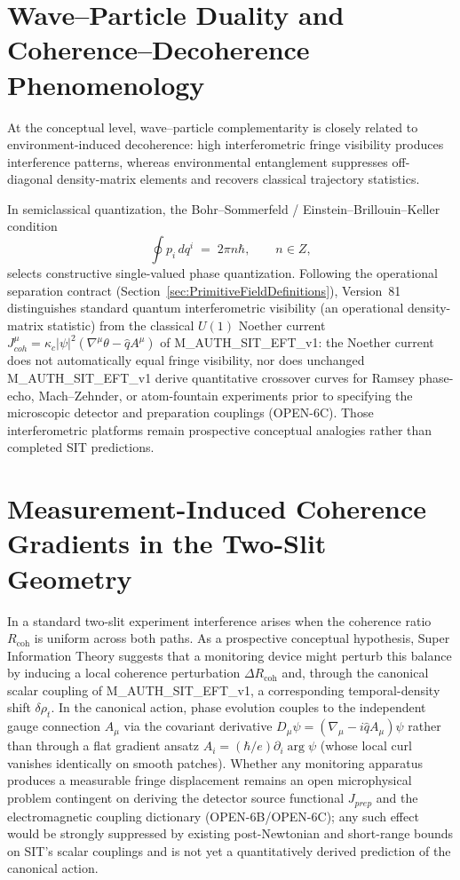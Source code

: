 \documentclass[american,11pt,letterpaper]{article}
\def\mathbb#1{#1}%
\def\mathrm#1{#1}%
\def\texttt#1{#1}%
\def\emph#1{#1}%
\begin{document}
\section{Wave--Particle Duality and Coherence--Decoherence Phenomenology}
\label{sec:duality}

At the conceptual level, wave--particle complementarity is closely related to environment-induced decoherence: high interferometric fringe visibility produces interference patterns, whereas environmental entanglement suppresses off-diagonal density-matrix elements and recovers classical trajectory statistics.

In semiclassical quantization, the Bohr--Sommerfeld / Einstein--Brillouin--Keller condition
\begin{equation}\label{eq:EBK}
   \oint p_i\,dq^i \;=\; 2\pi n\hbar,
   \qquad n\in\mathbb{Z},
\end{equation}
selects constructive single-valued phase quantization. Following the operational separation contract (Section~\ref{sec:PrimitiveFieldDefinitions}), Version~81 distinguishes standard quantum interferometric visibility (an operational density-matrix statistic) from the classical $U(1)$ Noether current $J^\mu_{\mathrm{coh}} = \kappa_c|\psi|^2(\nabla^\mu\theta - \hat{q}A^\mu)$ of \texttt{M\_AUTH\_SIT\_EFT\_v1}: the Noether current does \emph{not} automatically equal fringe visibility, nor does unchanged \texttt{M\_AUTH\_SIT\_EFT\_v1} derive quantitative crossover curves for Ramsey phase-echo, Mach--Zehnder, or atom-fountain experiments prior to specifying the microscopic detector and preparation couplings (\texttt{OPEN-6C}). Those interferometric platforms remain prospective conceptual analogies rather than completed SIT predictions.

\section{Measurement-Induced Coherence Gradients in the Two-Slit Geometry}
\label{sec:two-slit}

In a standard two-slit experiment interference arises when the
coherence ratio \(R_{\text{coh}}\) is uniform across both paths. As a
prospective conceptual hypothesis, Super Information Theory suggests
that a monitoring device might perturb this balance by inducing a
local coherence perturbation \(\Delta R_{\text{coh}}\) and, through
the canonical scalar coupling of \texttt{M\_AUTH\_SIT\_EFT\_v1}, a
corresponding temporal-density shift \(\delta\rho_t\). In the
canonical action, phase evolution couples to the independent gauge
connection \(A_\mu\) via the covariant derivative
\(D_\mu\psi = (\nabla_\mu - i\hat{q}A_\mu)\psi\) rather than through a
flat gradient ansatz \(A_i = (\hbar/e)\partial_i\arg\psi\) (whose
local curl vanishes identically on smooth patches). Whether any
monitoring apparatus produces a measurable fringe displacement remains
an open microphysical problem contingent on deriving the detector
source functional \(J_{\mathrm{prep}}\) and the electromagnetic
coupling dictionary (\texttt{OPEN-6B}/\texttt{OPEN-6C}); any such
effect would be strongly suppressed by existing post-Newtonian and
short-range bounds on SIT's scalar couplings and is not yet a
quantitatively derived prediction of the canonical action.
\end{document}
